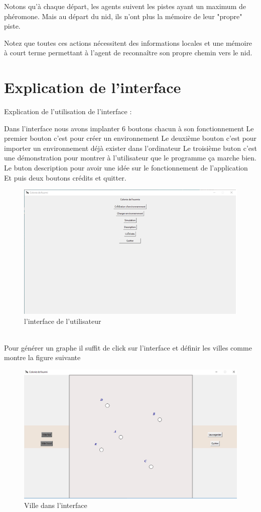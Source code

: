 \documentclass{rapportECL}
\begin{document}
Notons qu’à chaque départ, les agents suivent les pistes ayant un maximum de phéromone. Mais au départ du nid, ils n’ont plus la mémoire de leur "propre" piste.

Notez que toutes ces actions nécessitent des informations locales et une mémoire à court terme permettant à l’agent de reconnaître son propre chemin vers le nid.

\section{Explication de l'interface}

Explication de l’utilisation de l’interface : 

Dans l’interface nous avons implanter 6 boutons chacun à son fonctionnement 
Le premier bouton c’est pour créer un environnement
Le deuxième bouton c’est pour importer un environnement déjà exister dans l’ordinateur
Le troisième buton c’est une démonstration pour montrer à l’utilisateur que le programme ça marche bien.
Le buton description pour avoir une idée sur le fonctionnement de l’application 
Et puis deux boutons crédits et quitter.
 
 \begin{figure}[H]
    \centering
    \includegraphics[width=0.8\linewidth]{1.png}
    \caption{ l'interface de l'utilisateur }
    \label{Dim}
\end{figure}\\
 
Pour générer un graphe il suffit de click sur l’interface et définir les villes comme montre la figure suivante 

 \begin{figure}[H]
    \centering
    \includegraphics[width=0.8\linewidth]{2.png}
    \caption{ Ville dans l'interface }
    \label{Dim}
\end{figure}\\
\end{document}
